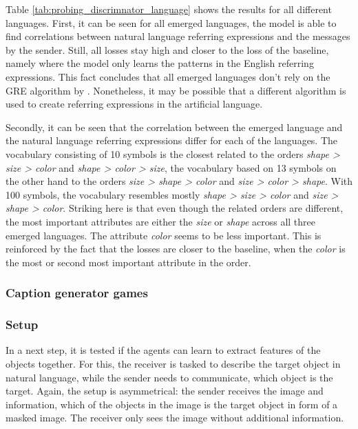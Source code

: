 Table \ref{tab:probing_discrimnator_language} shows the results for all different languages.
First, it can be seen for all emerged languages, the model is able to find correlations between natural language referring expressions and the messages by the sender.
Still, all losses stay high and closer to the loss of the baseline, namely where the model only learns the patterns in the English referring expressions.
This fact concludes that all emerged languages don't rely on the GRE algorithm by \citet{Dale1995}.
Nonetheless, it may be possible that a different algorithm is used to create referring expressions in the artificial language.

Secondly, it can be seen that the correlation between the emerged language and the natural language referring expressions differ for each of the languages.
The vocabulary consisting of 10 symbols is the closest related to the orders \emph{shape > size > color} and \emph{shape > color > size}, the vocabulary based on 13 symbols on the other hand to the orders \emph{size > shape > color} and \emph{size > color > shape}.
With 100 symbols, the vocabulary resembles mostly \emph{shape > size > color} and \emph{size > shape > color}.
Striking here is that even though the related orders are different, the most important attributes are either the \emph{size} or \emph{shape} across all three emerged languages.
The attribute \emph{color} seems to be less important.
This is reinforced by the fact that the losses are closer to the baseline, when the \emph{color} is the most or second most important attribute in the order.


\subsubsection{Caption generator games}
\subsubsection*{Setup}

In a next step, it is tested if the agents can learn to extract features of the objects together.
For this, the receiver is tasked to describe the target object in natural language, while the sender needs to communicate, which object is the target.
Again, the setup is asymmetrical: the sender receives the image and information, which of the objects in the image is the target object in form of a masked image.
The receiver only sees the image without additional information.

